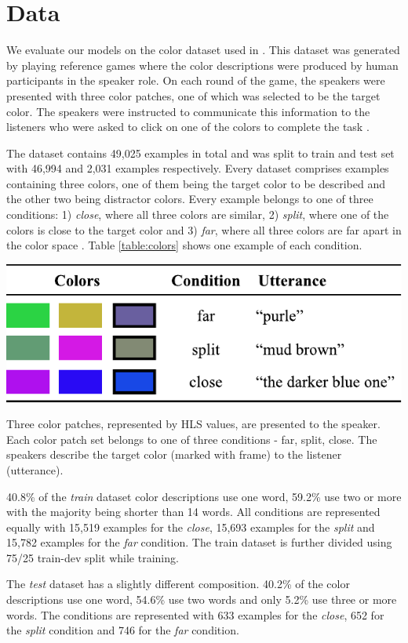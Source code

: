 \section{Data}

We evaluate our models on the color dataset used in \citep{monroe-2017-colors}. This dataset was generated by playing reference games where the color descriptions were produced by human participants in the speaker role. On each round of the game, the speakers were presented with three color patches, one of which was selected to be the target color. The speakers were instructed to communicate this information to the listeners who were asked to click on one of the colors to complete the task \citep{monroe-2017-colors}.

\par
The dataset contains 49,025 examples in total and was split to train and test set with 46,994 and 2,031 examples respectively. Every dataset comprises examples containing three colors, one of them being the target color to be described and the other two being distractor colors. Every example belongs to one of three conditions: 1) \emph{close}, where all three colors are similar, 2) \emph{split}, where one of the colors is close to the target color and 3) \emph{far}, where all three colors are far apart in the color space \citep{monroe-2017-colors}. Table \ref{table:colors} shows one example of each condition.

\begin{table}[ht]
\centering
\includegraphics[width=\columnwidth]{assets/colors.pdf}
\caption[Colors]{Three color patches, represented by HLS values, are presented to the speaker. Each color patch set belongs to one of three conditions - far, split, close. The speakers describe the target color (marked with frame) to the listener (utterance).}
\label{table:colors}
\end{table}

\par
40.8\% of the \emph{train} dataset color descriptions use one word, 59.2\% use two or more with the majority being shorter than 14 words. All conditions are represented equally with 15,519 examples for the \emph{close}, 15,693 examples for the \emph{split} and 15,782 examples for the \emph{far} condition. The train dataset is further divided using 75/25 train-dev split while training.

\par
The \emph{test} dataset has a slightly different composition. 40.2\% of the color descriptions use one word, 54.6\% use two words and only 5.2\% use three or more words. The conditions are represented with 633 examples for the \emph{close}, 652 for the \emph{split} condition and 746 for the \emph{far} condition.
